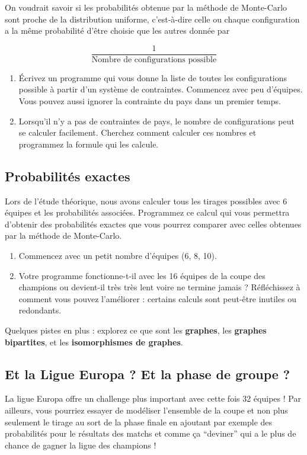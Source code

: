\documentclass{../ficheTDTP}
\begin{document}
On voudrait savoir si les probabilités obtenue par la méthode de Monte-Carlo sont proche de la distribution uniforme, c'est-à-dire celle ou chaque configuration a la même probabilité d'être choisie que les autres donnée par

\begin{equation*}
\frac{1}{\text{Nombre de configurations possible}}
\end{equation*}

\begin{enumerate}
\item \'Ecrivez un programme qui vous donne la liste de toutes les configurations possible à partir d'un système de contraintes. Commencez avec peu d'équipes. Vous pouvez aussi ignorer la contrainte du pays dans un premier temps.
\item Lorsqu'il n'y a pas de contraintes de pays, le nombre de configurations peut se calculer facilement. Cherchez comment calculer ces nombres et programmez la formule qui les calcule.
\end{enumerate}

\subsection{Probabilités exactes}

Lors de l'étude théorique, nous avons calculer tous les tirages possibles avec 6 équipes et les probabilités associées. Programmez ce calcul qui vous permettra d'obtenir des probabilités exactes que vous pourrez comparer avec celles obtenues par la méthode de Monte-Carlo.

\begin{enumerate}
\item Commencez avec un petit nombre d'équipes (6, 8, 10).
\item Votre programme fonctionne-t-il avec les 16 équipes de la coupe des champions ou devient-il très très lent voire ne termine jamais ? Réfléchissez à comment vous pouvez l'améliorer : certains calculs sont peut-être inutiles ou redondants. 
\end{enumerate}

Quelques pistes en plus : explorez ce que sont les \textbf{graphes}, les \textbf{graphes bipartites}, et les \textbf{isomorphismes de graphes}.

\subsection{Et la Ligue Europa ? Et la phase de groupe ?}

La ligue Europa offre un challenge plus important avec cette fois 32 équipes ! Par ailleurs, vous pourriez essayer de modéliser l'ensemble de la coupe et non plus seulement le tirage au sort de la phase finale en ajoutant par exemple des probabilités pour le résultats des matchs et comme ça ``deviner'' qui a le plus de chance de gagner la ligue des champions !
\end{document}
